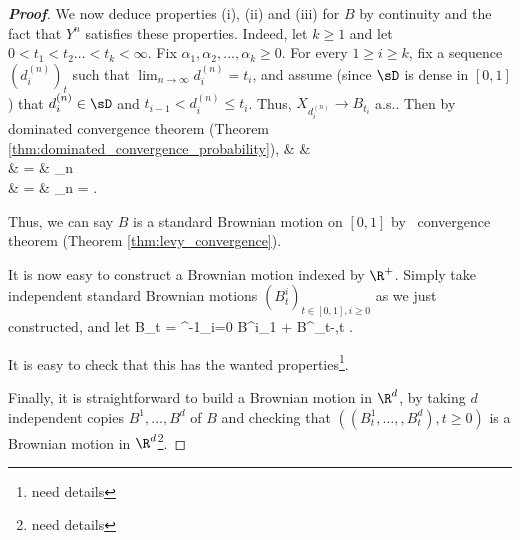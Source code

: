 \begin{proof}[\bf Proof]
We now deduce properties (i), (ii) and (iii) for $B$ by continuity and the fact that $Y^n$ satisfies these properties. Indeed, let $k \geq 1$ and let $0 < t_1 < t_2 \dots < t_k < \infty$. Fix $\alpha_1, \alpha_2,\dots, \alpha_k \geq 0$. For every $1 \geq i \geq k$, fix a sequence $(d^{(n)}_i)_t$ such that $\lim_{n\to \infty} d^{(n)}_i = t_i$, and assume (since $\sD$ is dense in $[0, 1]$) that $d^{(n)}_i\in \sD$ and $t_{i-1} < d^{(n)}_i \leq t_i$. Thus, $X_{d^{(n)}_i} \to B_{t_i}$ a.s.. Then by dominated convergence theorem (Theorem \ref{thm:dominated_convergence_probability}),
\beast
& & \E{}\\
& = & \lim_{n\to \infty} \E{}\\
& = & \lim_{n\to \infty} \exp{} = \exp{}.
\eeast

Thus, we can say $B$ is a standard Brownian motion on $[0,1]$ by \levy\ convergence theorem (Theorem \ref{thm:levy_convergence}).

It is now easy to construct a Brownian motion indexed by $\R^+$. Simply take independent standard Brownian motions $(B^i_t)_{t\in [0 ,1],i \geq 0}$ as we just constructed, and let
\be
B_t = \sum^{-1}_{i=0} B^i_1 + B^{}_{t-},\quad t .
\ee

It is easy to check that this has the wanted properties\footnote{need details}.

Finally, it is straightforward to build a Brownian motion in $\R^d$, by taking $d$ independent copies $B^1,\dots,B^d$ of $B$ and checking that $((B^1_t ,\dots, ,B^d_t ), t \geq 0)$ is a Brownian motion in $\R^d$\footnote{need details}.
\end{proof}


